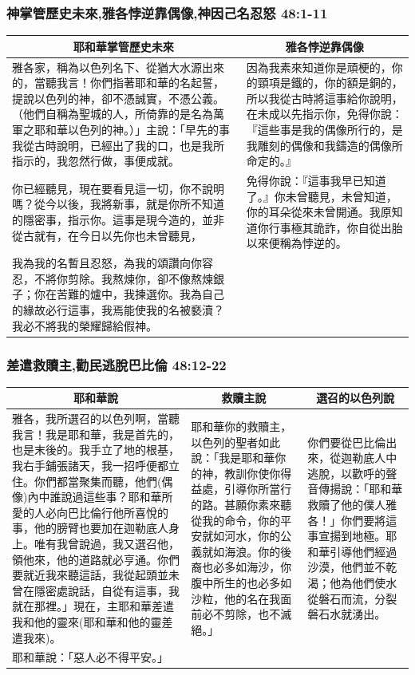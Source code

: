 \subsubsection{神掌管歷史未來,雅各悖逆靠偶像,神因己名忍怒 48:1-11}
\begin{table}[H]
\centering
\begin{tabular}{p{10.25cm}|p{6.50cm}}\hline\hline
\multicolumn{1}{c|}{耶和華掌管歷史未來}&\multicolumn{1}{c}{雅各悖逆靠偶像}\\\hline
雅各家，稱為以色列名下、從猶大水源出來的，當聽我言！你們指著耶和華的名起誓，提說以色列的神，卻不憑誠實，不憑公義。（他們自稱為聖城的人，所倚靠的是名為萬軍之耶和華以色列的神。）」主說：「早先的事我從古時說明，已經出了我的口，也是我所指示的，我忽然行做，事便成就。 
&因為我素來知道你是頑梗的，你的頸項是鐵的，你的額是銅的，所以我從古時將這事給你說明，在未成以先指示你，免得你說：『這些事是我的偶像所行的，是我雕刻的偶像和我鑄造的偶像所命定的。』 \\\hline
你已經聽見，現在要看見這一切，你不說明嗎？從今以後，我將新事，就是你所不知道的隱密事，指示你。這事是現今造的，並非從古就有，在今日以先你也未曾聽見，
&免得你說：『這事我早已知道了。』你未曾聽見，未曾知道，你的耳朵從來未曾開通。我原知道你行事極其詭詐，你自從出胎以來便稱為悖逆的。\\\hline
我為我的名暫且忍怒，為我的頌讚向你容忍，不將你剪除。我熬煉你，卻不像熬煉銀子；你在苦難的爐中，我揀選你。我為自己的緣故必行這事，我焉能使我的名被褻瀆？我必不將我的榮耀歸給假神。
&\\\hline
\end{tabular}
\end{table}


\subsubsection{差遣救贖主,勸民逃脫巴比倫 48:12-22}
\begin{table}[H]
\centering
\begin{tabular}{p{8.25cm}|p{4.75cm}|p{3.75cm}}\hline\hline
\multicolumn{1}{c|}{耶和華說}&\multicolumn{1}{c|}{救贖主說}&\multicolumn{1}{c}{選召的以色列說}\\\hline
雅各，我所選召的以色列啊，當聽我言！我是耶和華，我是首先的，也是末後的。我手立了地的根基，我右手鋪張諸天，我一招呼便都立住。你們都當聚集而聽，他們(偶像)內中誰說過這些事？耶和華所愛的人必向巴比倫行他所喜悅的事，他的膀臂也要加在迦勒底人身上。唯有我曾說過，我又選召他，領他來，他的道路就必亨通。你們要就近我來聽這話，我從起頭並未曾在隱密處說話，自從有這事，我就在那裡。」現在，主耶和華差遣我和他的靈來(耶和華和他的靈差遣我來)。
&耶和華你的救贖主，以色列的聖者如此說：「我是耶和華你的神，教訓你使你得益處，引導你所當行的路。甚願你素來聽從我的命令，你的平安就如河水，你的公義就如海浪。你的後裔也必多如海沙，你腹中所生的也必多如沙粒，他的名在我面前必不剪除，也不滅絕。」
&你們要從巴比倫出來，從迦勒底人中逃脫，以歡呼的聲音傳揚說：「耶和華救贖了他的僕人雅各！」你們要將這事宣揚到地極。耶和華引導他們經過沙漠，他們並不乾渴；他為他們使水從磐石而流，分裂磐石水就湧出。 
\\\hline
耶和華說：「惡人必不得平安。」&&\\\hline
\end{tabular}
\end{table}


